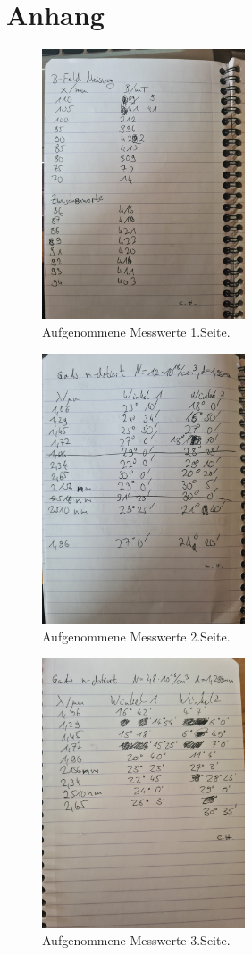 \section{Anhang}

\begin{figure} [H]
    \centering
    \includegraphics[height=8cm]{content/messwerte_1.jpeg}
    \caption{Aufgenommene Messwerte 1.Seite.}
\end{figure}

\begin{figure} [H]
    \centering
    \includegraphics[height=8cm]{content/messwerte_2.jpeg}
    \caption{Aufgenommene Messwerte 2.Seite.}
\end{figure}

\begin{figure} [H]
    \centering
    \includegraphics[height=8cm]{content/messwerte_3.jpeg}
    \caption{Aufgenommene Messwerte 3.Seite.}
\end{figure}

